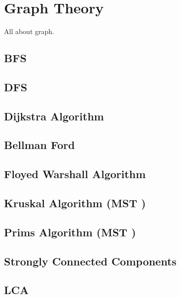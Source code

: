 \documentclass[10pt, a4paper,twocolumn]{article}
\begin{document}
\section{Graph Theory}
All about graph.

\subsection{BFS}


\subsection{DFS}


\subsection{Dijkstra Algorithm}


\subsection{Bellman Ford}


\subsection{Floyed Warshall Algorithm}


\subsection{Kruskal Algorithm (MST \allowbreak)}


\subsection{Prims Algorithm (MST \allowbreak)}


\subsection{Strongly Connected Components}


\subsection{LCA}

\end{document}
